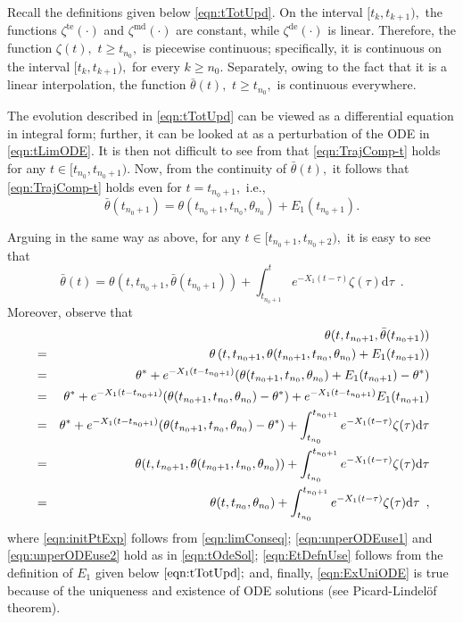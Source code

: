 \documentclass[usenames,dvipsnames,final,12pt]{colt2018} %
\newcommand{\Xt}{X_1}
\newcommand{\thS}{\theta^*}
\newcommand{\bart}{\bar{\theta}}
\newcommand{\Et}{E_1}
\newcommand{\tSol}[1]{\theta(#1, \tI{n_0}, \theta_{n_0})}
\newcommand{\zetD}{\zeta^{\dt}}
\newcommand{\zetM}{\zeta^{\md}}
\newcommand{\zetT}{\zeta^{\te}}
\newcommand{\dt}{\text{de}}
\newcommand{\md}{\text{md}}
\newcommand{\te}{\text{te}}
\newcommand{\df}{\mathrm{d}}
\newcommand{\tI}[1]{t_{#1}}
\newcommand{\galn}[1]{{\color{ForestGreen} #1}}
\begin{document}

Recall the definitions given below \eqref{eqn:tTotUpd}. On the interval $[\tI{k}, \tI{k + 1}),$ the functions $\zetT(\cdot)$ and $\zetM(\cdot)$ are constant, while $\zetD(\cdot)$ is linear. Therefore, the function $\zeta(t),$ $t \geq \tI{n_0},$ is piecewise continuous; specifically, it is continuous on the interval $[\tI{k}, \tI{k + 1}),$ for every $k \geq n_0.$ Separately, owing to the fact that it is a linear interpolation, the function $\bart(t),$ $t \geq \tI{n_0},$ is continuous everywhere.

The evolution described in \eqref{eqn:tTotUpd} can be viewed as a differential equation in integral form; further, it can be looked at as a perturbation of the ODE in \eqref{eqn:tLimODE}. It is then not difficult to see from \citep[Theorem 1.1.2]{lakshmikantham1998method} that \eqref{eqn:TrajComp-t} holds for any $t \in [\tI{n_0}, \tI{n_0 + 1}).$ Now, from the continuity of $\bart(t),$ it follows that  \eqref{eqn:TrajComp-t} holds even for $t = \tI{n_0 + 1},$ i.e.,
%
\begin{equation}
\label{eqn:limConseq}
\bart(\tI{n_0 + 1}) = \tSol{\tI{n_0 + 1}} + \Et(\tI{n_0 + 1}).
\end{equation}

Arguing in the same way as above, for any $t \in [\tI{n_0 + 1}, \tI{n_0+ 2}),$ it is easy to see that
%
\begin{equation}
\label{eqn:VoPTemp}
\bart(t) = \theta(t, \tI{n_0 + 1}, \bart(\tI{n_0 + 1})) + \int_{\tI{n_0 + 1}}^{t}e^{-\Xt(t - \tau)} \zeta(\tau) \df \tau \enspace.
\end{equation}
%
Moreover, observe that
%
\begin{eqnarray}
& & \theta(t, \tI{n_0 + 1}, \bart(\tI{n_0 + 1}))\\
%
& = & \theta\left(t, \tI{n_0 + 1}, \tSol{\tI{n_0 + 1}} + \Et(\tI{n_0 + 1})\right) \label{eqn:initPtExp}\\
%
& = & \thS + e^{-\Xt(t - \tI{n_0 + 1})} (\tSol{\tI{n_0 + 1}} + \Et(\tI{n_0 + 1}) - \thS) \label{eqn:unperODEuse1}\\
%
& = & \thS + e^{-\Xt(t - \tI{n_0 + 1})} (\tSol{\tI{n_0 + 1}} - \thS) +  e^{-\Xt(t - \tI{n_0 + 1})}\Et(\tI{n_0 + 1}) \notag \\
%
& = & \thS + e^{-\Xt(t - \tI{n_0 + 1})} (\tSol{\tI{n_0 + 1}} - \thS) +  \int_{\tI{n_0}}^{\tI{n_0 + 1}} e^{-\Xt(t - \tau)} \zeta(\tau) \df \tau \label{eqn:EtDefnUse}\\
%
& = & \theta(t, \tI{n_0 + 1}, \theta(\tI{n_0 + 1}, \tI{n_0}, \theta_{n_0})) +  \int_{\tI{n_0}}^{\tI{n_0 + 1}} e^{-\Xt(t - \tau)} \zeta(\tau) \df \tau \label{eqn:unperODEuse2}\\
%
&= & \theta(t, \tI{n_0}, \theta_{n_0}) +  \int_{\tI{n_0}}^{\tI{n_0 + 1}} e^{-\Xt(t - \tau)} \zeta(\tau) \df \tau \enspace \label{eqn:ExUniODE},
\end{eqnarray}
%
where \eqref{eqn:initPtExp} follows from \eqref{eqn:limConseq}; \eqref{eqn:unperODEuse1} and \eqref{eqn:unperODEuse2} hold as in \eqref{eqn:tOdeSol}; \eqref{eqn:EtDefnUse} follows from the definition of $\Et$ given below $\eqref{eqn:tTotUpd};$ and, finally, \eqref{eqn:ExUniODE} is true because of the uniqueness and existence of ODE solutions (see Picard-Lindel\"{o}f theorem).
\end{document}
